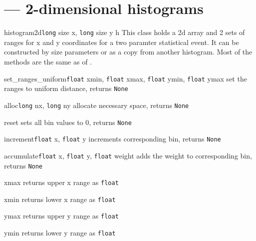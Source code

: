\section{\protect{} --- 2-dimensional histograms}

\begin{classdesc}{histogram2d}{\texttt{long} size x, \texttt{long} size y
                               \code{|}  h}
This class holds a 2d array and 2 sets of ranges for x and y coordinates for a
two paramter statistical event. It can be constructed by size parameters or
as a copy from another histogram. Most of the methods are the same as of
.
\end{classdesc}

\begin{methoddesc}{set_ranges_uniform}{\texttt{float} xmin, \texttt{float} xmax,
                                       \texttt{float} ymin, \texttt{float} ymax}
set the ranges to uniform distance, \hfill returns \texttt{None}
\end{methoddesc}
\begin{methoddesc}{alloc}{\texttt{long} nx, \texttt{long} ny}
allocate necessary space, \hfill returns \texttt{None}
\end{methoddesc}
\begin{methoddesc}{reset}{}
sets all bin values to 0, \hfill returns \texttt{None}
\end{methoddesc}
\begin{methoddesc}{increment}{\texttt{float} x, \texttt{float} y}
increments corresponding bin, \hfill returns \texttt{None}
\end{methoddesc}
\begin{methoddesc}{accumulate}{\texttt{float} x, \texttt{float} y,
                               \texttt{float} weight}
adds the weight to corresponding bin, \hfill returns \texttt{None}
\end{methoddesc}
\begin{methoddesc}{xmax}{}
returns upper x range \hfill as \texttt{float}
\end{methoddesc}
\begin{methoddesc}{xmin}{}
returns lower x range \hfill as \texttt{float}
\end{methoddesc}
\begin{methoddesc}{ymax}{}
returns upper y range \hfill as \texttt{float}
\end{methoddesc}
\begin{methoddesc}{ymin}{}
returns lower y range \hfill as \texttt{float}
\end{methoddesc}

